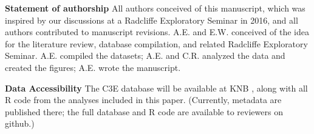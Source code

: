 \documentclass{article}
\begin{document}











\date{\today}
\maketitle  %
\tableofcontents      %

\textbf{Statement of authorship} %
All authors conceived of this manuscript, which was inspired by our discussions at a Radcliffe Exploratory Seminar in 2016, and all authors contributed to manuscript revisions. A.E. and E.W. conceived of the idea for the literature review, database compilation, and related Radcliffe Exploratory Seminar. A.E. compiled the datasets; A.E. and C.R. analyzed the data and created the figures; A.E. wrote the manuscript.

\textbf{Data Accessibility} %
The C3E database will be available at KNB \citep{ettinger2017}, along with all R code from the analyses included in this paper. (Currently, metadata are published there; the full database and R code are available to reviewers on github.) 
\end{document}
